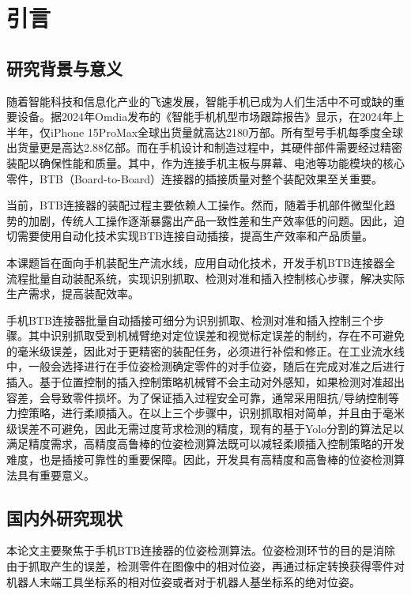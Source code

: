 \documentclass{Diploma}
\begin{document}
\StartMainText%

\chapter[preface]{引言}
\section{研究背景与意义}
随着智能科技和信息化产业的飞速发展，智能手机已成为人们生活中不可或缺的重要设备。据2024年Omdia发布的《智能手机机型市场跟踪报告》显示，在2024年上半年，仅iPhone 15ProMax全球出货量就高达2180万部。所有型号手机每季度全球出货量更是高达2.88亿部。而在手机设计和制造过程中，其硬件部件需要经过精密装配以确保性能和质量。其中，作为连接手机主板与屏幕、电池等功能模块的核心零件，BTB（Board-to-Board）连接器的插接质量对整个装配效果至关重要。

当前，BTB连接器的装配过程主要依赖人工操作。然而，随着手机部件微型化趋势的加剧，传统人工操作逐渐暴露出产品一致性差和生产效率低的问题。因此，迫切需要使用自动化技术实现BTB连接自动插接，提高生产效率和产品质量\cite{sahoo2022smart}。
%

本课题旨在面向手机装配生产流水线，应用自动化技术，开发手机BTB连接器全流程批量自动装配系统，实现识别抓取、检测对准和插入控制核心步骤，解决实际生产需求，提高装配效率。

手机BTB连接器批量自动插接可细分为识别抓取、检测对准和插入控制三个步骤\cite{jiang2022state}。其中识别抓取受到机械臂绝对定位误差和视觉标定误差的制约，存在不可避免的毫米级误差，因此对于更精密的装配任务，必须进行补偿和修正。在工业流水线中，一般会选择进行在手位姿检测确定零件的对手位姿，随后在完成对准之后进行插入。基于位置控制的插入控制策略机械臂不会主动对外感知，如果检测对准超出容差，会导致零件损坏。为了保证插入过程安全可靠，通常采用阻抗/导纳控制等力控策略，进行柔顺插入。在以上三个步骤中，识别抓取相对简单，并且由于毫米级误差不可避免，因此无需过度苛求检测的精度，现有的基于Yolo分割的算法足以满足精度需求，高精度高鲁棒的位姿检测算法既可以减轻柔顺插入控制策略的开发难度，也是插接可靠性的重要保障。因此，开发具有高精度和高鲁棒的位姿检测算法具有重要意义。
\section{国内外研究现状}
本论文主要聚焦于手机BTB连接器的位姿检测算法。位姿检测环节的目的是消除由于抓取产生的误差，检测零件在图像中的相对位姿，再通过标定转换获得零件对机器人末端工具坐标系的相对位姿或者对于机器人基坐标系的绝对位姿。
\end{document}

